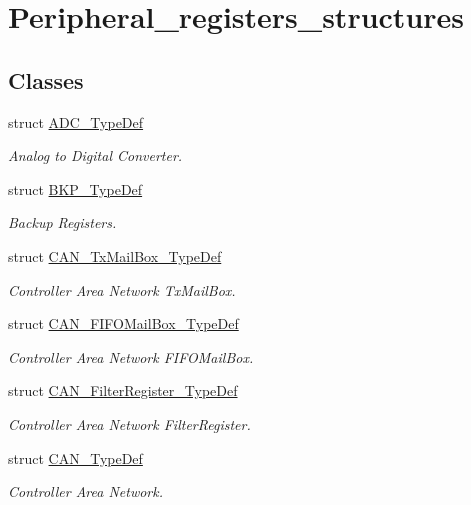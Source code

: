 \hypertarget{group___peripheral__registers__structures}{}\section{Peripheral\+\_\+registers\+\_\+structures}
\label{group___peripheral__registers__structures}
\subsection*{Classes}
\begin{DoxyCompactItemize}
\item 
struct \hyperlink{struct_a_d_c___type_def}{A\+D\+C\+\_\+\+Type\+Def}
\begin{DoxyCompactList}\small\item\em Analog to Digital Converter. \end{DoxyCompactList}\item 
struct \hyperlink{struct_b_k_p___type_def}{B\+K\+P\+\_\+\+Type\+Def}
\begin{DoxyCompactList}\small\item\em Backup Registers. \end{DoxyCompactList}\item 
struct \hyperlink{struct_c_a_n___tx_mail_box___type_def}{C\+A\+N\+\_\+\+Tx\+Mail\+Box\+\_\+\+Type\+Def}
\begin{DoxyCompactList}\small\item\em Controller Area Network Tx\+Mail\+Box. \end{DoxyCompactList}\item 
struct \hyperlink{struct_c_a_n___f_i_f_o_mail_box___type_def}{C\+A\+N\+\_\+\+F\+I\+F\+O\+Mail\+Box\+\_\+\+Type\+Def}
\begin{DoxyCompactList}\small\item\em Controller Area Network F\+I\+F\+O\+Mail\+Box. \end{DoxyCompactList}\item 
struct \hyperlink{struct_c_a_n___filter_register___type_def}{C\+A\+N\+\_\+\+Filter\+Register\+\_\+\+Type\+Def}
\begin{DoxyCompactList}\small\item\em Controller Area Network Filter\+Register. \end{DoxyCompactList}\item 
struct \hyperlink{struct_c_a_n___type_def}{C\+A\+N\+\_\+\+Type\+Def}
\begin{DoxyCompactList}\small\item\em Controller Area Network. \end{DoxyCompactList}\item 

\end{DoxyCompactItemize}

